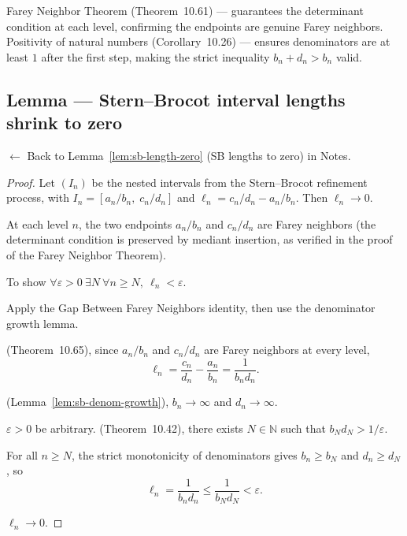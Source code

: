 \begin{remark*}[Dependencies]
Farey Neighbor Theorem (Theorem~10.61) --- guarantees the determinant
condition at each level, confirming the endpoints are genuine Farey
neighbors. Positivity of natural numbers (Corollary~10.26) --- ensures
denominators are at least $1$ after the first step, making the strict
inequality $b_n + d_n > b_n$ valid.
\end{remark*}



\subsection*{Lemma --- Stern--Brocot interval lengths shrink to zero}
\label{prf:sb-length-zero}

\begin{remark*}[Return]
$\leftarrow$ Back to Lemma~\ref{lem:sb-length-zero} (SB lengths to zero) in Notes.
\end{remark*}

\begin{proof}
\Claim Let $(I_n)$ be the nested intervals from the Stern--Brocot
refinement process, with $I_n = [a_n/b_n,\; c_n/d_n]$ and
$\ell_n = c_n/d_n - a_n/b_n$. Then $\ell_n \to 0$.

\Given At each level $n$, the two endpoints $a_n/b_n$ and $c_n/d_n$
are Farey neighbors (the determinant condition is preserved by mediant
insertion, as verified in the proof of the Farey Neighbor Theorem).

\Goal To show $\forall \varepsilon > 0\ \exists N\ \forall n \ge N,\ \ell_n < \varepsilon$.

\Strategy Apply the Gap Between Farey Neighbors identity, then use the
denominator growth lemma.

 (Theorem~10.65), since $a_n/b_n$
and $c_n/d_n$ are Farey neighbors at every level,
\[
  \ell_n = \frac{c_n}{d_n} - \frac{a_n}{b_n} = \frac{1}{b_n d_n}.
\]

(Lemma~\ref{lem:sb-denom-growth}), $b_n \to \infty$ and $d_n \to \infty$.

\Let $\varepsilon > 0$ be arbitrary.
 (Theorem~10.42), there
exists $N \in \mathbb{N}$ such that $b_N d_N > 1/\varepsilon$.

For all $n \ge N$, the strict monotonicity of denominators gives
$b_n \ge b_N$ and $d_n \ge d_N$, so
\[
  \ell_n = \frac{1}{b_n d_n} \le \frac{1}{b_N d_N} < \varepsilon.
\]

\Hence $\ell_n \to 0$. \AsReq
\end{proof}

